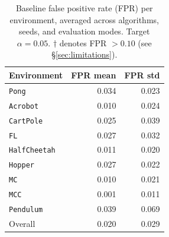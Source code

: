 \begin{table}[t]
\centering
\caption{Baseline false positive rate (FPR) per environment, averaged across algorithms, seeds, and evaluation modes. Target $\alpha = 0.05$. $\dagger$ denotes FPR $> 0.10$ (see \S\ref{sec:limitations}).}
\label{tab:baseline_fpr}
\begin{tabular}{lrr}
\toprule
Environment & FPR mean & FPR std \\
\midrule
\texttt{Pong} & 0.034 & 0.023 \\
\texttt{Acrobot} & 0.010 & 0.024 \\
\texttt{CartPole} & 0.025 & 0.039 \\
\texttt{FL} & 0.027 & 0.032 \\
\texttt{HalfCheetah} & 0.011 & 0.020 \\
\texttt{Hopper} & 0.027 & 0.022 \\
\texttt{MC} & 0.010 & 0.021 \\
\texttt{MCC} & 0.001 & 0.011 \\
\texttt{Pendulum} & 0.039 & 0.069 \\
\midrule
Overall & 0.020 & 0.029 \\
\bottomrule
\end{tabular}
\end{table}